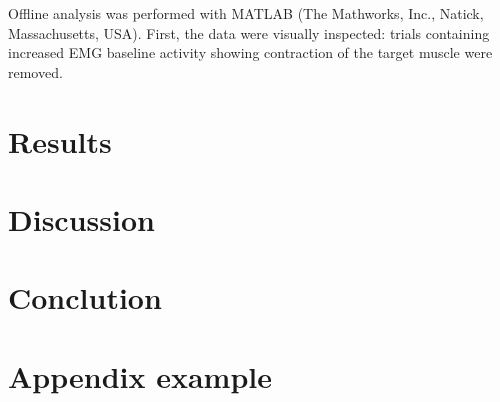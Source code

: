 \documentclass[english,12pt,a4paper,dvips]{article}
\begin{document}
Offline analysis was performed with MATLAB (The Mathworks, Inc., Natick,
Massachusetts, USA). First, the data were visually inspected: trials
containing increased EMG baseline activity showing contraction of the target muscle were removed. 




\clearpage
\section{Results}




\clearpage
\section{Discussion}
\clearpage
\section{Conclution} 

\clearpage


{}
{}





\clearpage
\appendix


\section{Appendix example \label{AppendixA}}
\renewcommand{\theequation}{A\arabic{equation}}
\setcounter{equation}{0}  
\renewcommand{\thefigure}{A\arabic{figure}}
\setcounter{figure}{0}
\renewcommand{\thetable}{A\arabic{table}}
\setcounter{table}{0}
\end{document}
